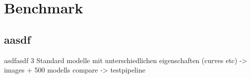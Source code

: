 \documentclass[../ClassicThesis.tex]{subfiles}
\begin{document}
\chapter{Benchmark}\label{ch:benchmark}

\section{aasdf}

asdfasdf
 3 Standard modelle mit unterschiedlichen eigenschaften (curves etc) -> images + 500 modells compare -> testpipeline
 
\end{document}
